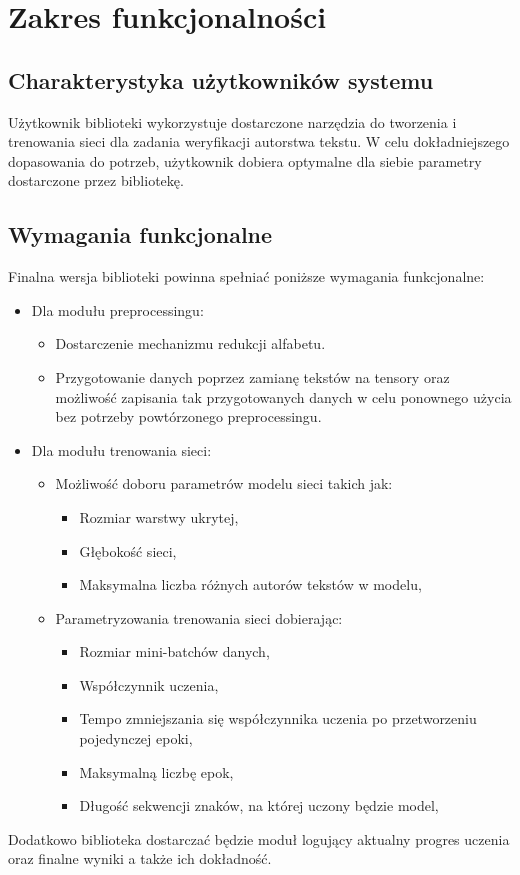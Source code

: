 \newpage
\section{Zakres funkcjonalności}

\subsection{Charakterystyka użytkowników systemu}
Użytkownik biblioteki wykorzystuje dostarczone narzędzia do tworzenia i trenowania sieci 
dla zadania weryfikacji autorstwa tekstu. W celu dokładniejszego dopasowania do potrzeb, 
użytkownik dobiera optymalne dla siebie parametry dostarczone przez bibliotekę.

 
\subsection{Wymagania funkcjonalne}
Finalna wersja biblioteki powinna spełniać poniższe wymagania funkcjonalne:
\begin{itemize}
 	\item Dla modułu preprocessingu:
	    \begin{itemize}
		    \item Dostarczenie mechanizmu redukcji alfabetu.
		    \item Przygotowanie danych poprzez zamianę tekstów na tensory oraz możliwość 
				zapisania tak przygotowanych danych w celu ponownego użycia bez potrzeby
				powtórzonego preprocessingu. 
	    \end{itemize}
 	\item Dla modułu trenowania sieci:
		\begin{itemize}
			\item Możliwość doboru parametrów modelu sieci takich jak:
				\begin{itemize}
			    	\item Rozmiar warstwy ukrytej,
			    	\item Głębokość sieci,
			    	\item Maksymalna liczba różnych autorów tekstów w modelu,
		    	\end{itemize}
			\item Parametryzowania trenowania sieci dobierając:
				\begin{itemize}
			    	\item Rozmiar mini-batchów danych,
			    	\item Współczynnik uczenia,
			    	\item Tempo zmniejszania się współczynnika uczenia po przetworzeniu pojedynczej epoki,
			    	\item Maksymalną liczbę epok,
			    	\item Długość sekwencji znaków, na której uczony będzie model,
		    	\end{itemize}
		  \end{itemize}
\end{itemize}
Dodatkowo biblioteka dostarczać będzie moduł logujący aktualny progres uczenia 
oraz finalne wyniki a także ich dokładność.	

